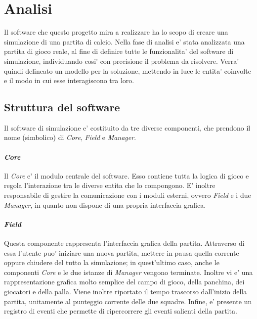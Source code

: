 
\section{Analisi}
\label{sec:analisi}

Il software che questo progetto mira a realizzare ha lo scopo di creare una simulazione di una partita di calcio. Nella fase di analisi e' stata analizzata una partita di gioco reale, al fine di definire tutte le funzionalita' del software di simulazione, individuando cosi' con precisione il problema da risolvere. Verra' quindi delineato un modello per la soluzione, mettendo in luce le entita' coinvolte e il modo in cui esse interagiscono tra loro.

\subsection{Struttura del software}
\label{sec:struttura_del_software}

Il software di simulazione e' costituito da tre diverse componenti, che prendono il nome (simbolico) di \textit{Core}, \textit{Field} e \textit{Manager}.

\paragraph{\textit{Core}} \label{sec:struttura_core} Il \textit{Core} e' il modulo centrale del software. Esso contiene tutta la logica di gioco e regola l'interazione tra le diverse entita che lo compongono. E' inoltre responsabile di gestire la comunicazione con i moduli esterni, ovvero \textit{Field} e i due \textit{Manager}, in quanto non dispone di una propria interfaccia grafica.

\paragraph{\textit{Field}} \label{sec:struttura_field} Questa componente rappresenta l'interfaccia grafica della partita. Attraverso di essa l'utente puo' iniziare una nuova partita, mettere in pausa quella corrente oppure chiudere del tutto la simulazione; in quest'ultimo caso, anche le componenti \textit{Core} e le due istanze di \textit{Manager} vengono terminate. Inoltre vi e' una rappresentazione grafica molto semplice del campo di gioco, della panchina, dei giocatori e della palla. Viene inoltre riportato il tempo trascorso dall'inizio della partita, unitamente al punteggio corrente delle due squadre. Infine, e' presente un registro di eventi che permette di ripercorrere gli eventi salienti della partita.

